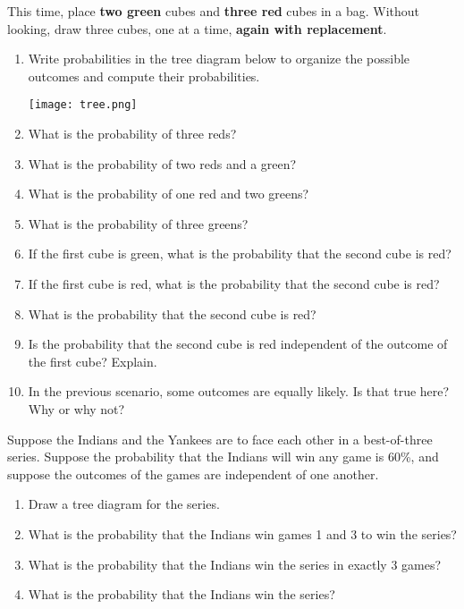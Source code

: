 \documentclass[nooutcomes]{ximera}
\begin{document}
\newpage
\begin{problem}
This time, place \textbf{two green} cubes and \textbf{three red} cubes in a bag.  Without looking, draw three cubes, one at a time, \textbf{again with replacement}.  
\begin{enumerate}
\item Write probabilities in the tree diagram below to organize the possible outcomes and compute their probabilities.  
\begin{image}
\texttt{[image: tree.png]}
\end{image}
\vspace{.15in}
\item What is the probability of three reds? 
\item What is the probability of two reds and a green? 
\item What is the probability of one red and two greens? 
\item What is the probability of three greens? 
\item If the first cube is green, what is the probability that the second cube is red? 
\item If the first cube is red, what is the probability that the second cube is red? 
\item What is the probability that the second cube is red?  
\item Is the probability that the second cube is red independent of the outcome of the first cube?  Explain. 
\item In the previous scenario, some outcomes are equally likely.  Is that true here?  Why or why not? 
\end{enumerate}
\end{problem}

\newpage

\begin{problem}
Suppose the Indians and the Yankees are to face each other in a best-of-three series.  Suppose the probability that the Indians will win any game is 60\%, and suppose the outcomes of the games are independent of one another.  
\begin{enumerate}
\item Draw a tree diagram for the series.  
\item What is the probability that the Indians win games 1 and 3 to win the series?
\item What is the probability that the Indians win the series in exactly 3 games?
\item What is the probability that the Indians win the series?
\end{enumerate}
\end{problem}
\end{document}
